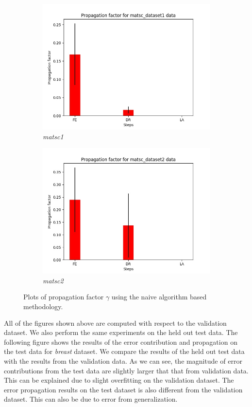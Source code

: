 \begin{figure}[H]
\begin{subfigure}{.5\textwidth}
  \includegraphics[scale=0.4]{img/EP/propagation_factor_random_pipeline_matsc_dataset1}
  \caption{\textit{matsc1}}
  \label{fig:sfig3}
\end{subfigure}%
\begin{subfigure}{.5\textwidth}
  \centering
  \includegraphics[scale=0.4]{img/EP/propagation_factor_random_pipeline_matsc_dataset2}
  \caption{\textit{matsc2}}
  \label{fig:sfig4}
\end{subfigure}

\caption{Plots of propagation factor $\gamma$ using the naive algorithm based methodology.}
\label{fig:fig}
\end{figure}


All of the figures shown above are computed with respect to the validation dataset. We also perform the same experiments on the held out test data. The following figure shows the results of the error contribution and propagation on the test data for \textit{breast} dataset. We compare the results of the held out test data with the results from the validation data. As we can see, the magnitude of error contributions from the test data are slightly larger that that from validation data. This can be explained due to slight overfitting on the validation dataset. The error propagation results on the test dataset is also different from the validation dataset. This can also be due to error from generalization.


